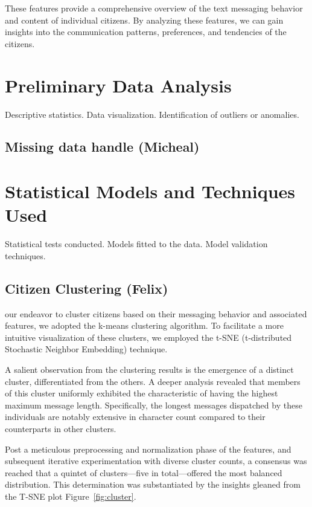 \documentclass[12pt]{article}
\begin{document}
These features provide a comprehensive overview of the text messaging behavior and content of individual citizens. By analyzing these features, we can gain insights into the communication patterns, preferences, and tendencies of the citizens.


\section{Preliminary Data Analysis}

Descriptive statistics.
Data visualization.
Identification of outliers or anomalies.

\subsection{Missing data handle (Micheal)}

\section{Statistical Models and Techniques Used}

Statistical tests conducted.
Models fitted to the data.
Model validation techniques.


\subsection{Citizen Clustering (Felix)}

our endeavor to cluster citizens based on their messaging behavior and associated features, we adopted the k-means clustering algorithm. To facilitate a more intuitive visualization of these clusters, we employed the t-SNE (t-distributed Stochastic Neighbor Embedding) technique. 

A salient observation from the clustering results is the emergence of a distinct cluster, differentiated from the others. A deeper analysis revealed that members of this cluster uniformly exhibited the characteristic of having the highest maximum message length. Specifically, the longest messages dispatched by these individuals are notably extensive in character count compared to their counterparts in other clusters.

Post a meticulous preprocessing and normalization phase of the features, and subsequent iterative experimentation with diverse cluster counts, a consensus was reached that a quintet of clusters—five in total—offered the most balanced distribution. This determination was substantiated by the insights gleaned 
from the T-SNE plot Figure~\ref{fig:cluster}.
\end{document}
